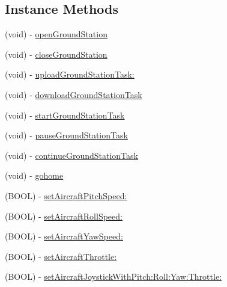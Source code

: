 \subsection*{Instance Methods}
\begin{DoxyCompactItemize}
\item 
(void) -\/ \hyperlink{protocol_d_j_i_ground_station-p_a40c95668389564fabc888728e3a41fdd}{open\+Ground\+Station}
\item 
(void) -\/ \hyperlink{protocol_d_j_i_ground_station-p_a8277820cbee7b21d66f6b451b3490929}{close\+Ground\+Station}
\item 
(void) -\/ \hyperlink{protocol_d_j_i_ground_station-p_ab97ecb07317f961ffdf3a9fa8c49cf93}{upload\+Ground\+Station\+Task\+:}
\item 
(void) -\/ \hyperlink{protocol_d_j_i_ground_station-p_a025e4e9ff19bb0a587da014d36dcb1ad}{download\+Ground\+Station\+Task}
\item 
(void) -\/ \hyperlink{protocol_d_j_i_ground_station-p_adcdbcd7826de846abbcb6aa7dd370cce}{start\+Ground\+Station\+Task}
\item 
(void) -\/ \hyperlink{protocol_d_j_i_ground_station-p_a20b05354a058a92bd3e9299f8789df51}{pause\+Ground\+Station\+Task}
\item 
(void) -\/ \hyperlink{protocol_d_j_i_ground_station-p_ac8cc4c027e84e00470e6b66e30b1d0b6}{continue\+Ground\+Station\+Task}
\item 
(void) -\/ \hyperlink{protocol_d_j_i_ground_station-p_a7e98c94e54d37dffa04af4725f4e4dc9}{gohome}
\item 
(B\+O\+O\+L) -\/ \hyperlink{protocol_d_j_i_ground_station-p_a5a673afff4673f9bb76db0ad81b0bc96}{set\+Aircraft\+Pitch\+Speed\+:}
\item 
(B\+O\+O\+L) -\/ \hyperlink{protocol_d_j_i_ground_station-p_a252a8ba557644867ebd9c5a9af4a06ac}{set\+Aircraft\+Roll\+Speed\+:}
\item 
(B\+O\+O\+L) -\/ \hyperlink{protocol_d_j_i_ground_station-p_a48d6a1e3162e44f045d8542912ff5b9a}{set\+Aircraft\+Yaw\+Speed\+:}
\item 
(B\+O\+O\+L) -\/ \hyperlink{protocol_d_j_i_ground_station-p_a426d344c5747117275fbbeb94d0cfac2}{set\+Aircraft\+Throttle\+:}
\item 
(B\+O\+O\+L) -\/ \hyperlink{protocol_d_j_i_ground_station-p_ac9087399fe652fa5e50d402113db73f9}{set\+Aircraft\+Joystick\+With\+Pitch\+:\+Roll\+:\+Yaw\+:\+Throttle\+:}
\end{DoxyCompactItemize}
